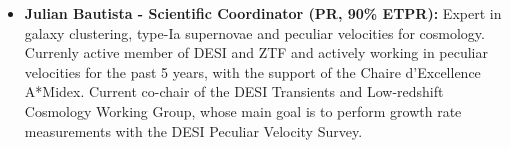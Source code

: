\begin{itemize}


     \item \textbf{Julian Bautista - Scientific Coordinator (PR, 90\% ETPR):} 
    Expert in galaxy clustering, 
    type-Ia supernovae and peculiar velocities for cosmology. 
    Currenly active member of DESI and ZTF and actively working 
    in peculiar velocities for the past 5 years, with the support of the Chaire d'Excellence A*Midex.
    Current co-chair of the DESI Transients and Low-redshift Cosmology Working Group, 
    whose main goal is to perform growth rate measurements with the DESI Peculiar Velocity Survey. 
    



\end{itemize}

